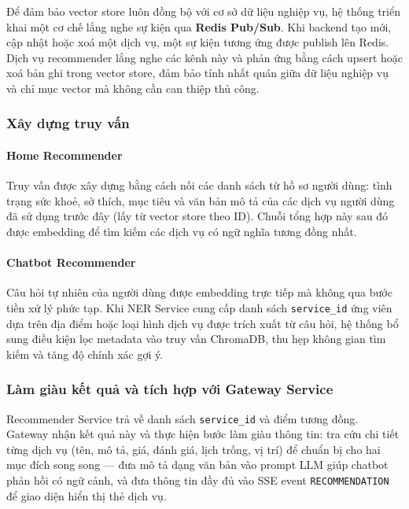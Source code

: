 Để đảm bảo vector store luôn đồng bộ với cơ sở dữ liệu nghiệp vụ, hệ thống triển khai một cơ chế lắng nghe sự kiện qua \textbf{Redis Pub/Sub}. Khi backend tạo mới, cập nhật hoặc xoá một dịch vụ, một sự kiện tương ứng được publish lên Redis. Dịch vụ recommender lắng nghe các kênh này và phản ứng bằng cách upsert hoặc xoá bản ghi trong vector store, đảm bảo tính nhất quán giữa dữ liệu nghiệp vụ và chỉ mục vector mà không cần can thiệp thủ công.

\subsubsection{Xây dựng truy vấn}

\paragraph{Home Recommender}
Truy vấn được xây dựng bằng cách nối các danh sách từ hồ sơ người dùng: tình trạng sức khoẻ, sở thích, mục tiêu và văn bản mô tả của các dịch vụ người dùng đã sử dụng trước đây (lấy từ vector store theo ID). Chuỗi tổng hợp này sau đó được embedding để tìm kiếm các dịch vụ có ngữ nghĩa tương đồng nhất.

\paragraph{Chatbot Recommender}
Câu hỏi tự nhiên của người dùng được embedding trực tiếp mà không qua bước tiền xử lý phức tạp. Khi NER Service cung cấp danh sách \texttt{service\_id} ứng viên dựa trên địa điểm hoặc loại hình dịch vụ được trích xuất từ câu hỏi, hệ thống bổ sung điều kiện lọc metadata vào truy vấn ChromaDB, thu hẹp không gian tìm kiếm và tăng độ chính xác gợi ý.

\subsubsection{Làm giàu kết quả và tích hợp với Gateway Service}

Recommender Service trả về danh sách \texttt{service\_id} và điểm tương đồng. Gateway nhận kết quả này và thực hiện bước làm giàu thông tin: tra cứu chi tiết từng dịch vụ (tên, mô tả, giá, đánh giá, lịch trống, vị trí) để chuẩn bị cho hai mục đích song song — đưa mô tả dạng văn bản vào prompt LLM giúp chatbot phản hồi có ngữ cảnh, và đưa thông tin đầy đủ vào SSE event \texttt{RECOMMENDATION} để giao diện hiển thị thẻ dịch vụ.


